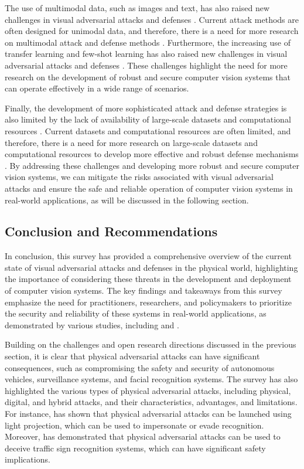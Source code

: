 \documentclass[11pt]{article}
\begin{document}
The use of multimodal data, such as images and text, has also raised new challenges in visual adversarial attacks and defenses \cite{ref229}. Current attack methods are often designed for unimodal data, and therefore, there is a need for more research on multimodal attack and defense methods \cite{ref230}. Furthermore, the increasing use of transfer learning and few-shot learning has also raised new challenges in visual adversarial attacks and defenses \cite{ref231}. These challenges highlight the need for more research on the development of robust and secure computer vision systems that can operate effectively in a wide range of scenarios.

Finally, the development of more sophisticated attack and defense strategies is also limited by the lack of availability of large-scale datasets and computational resources \cite{ref232}. Current datasets and computational resources are often limited, and therefore, there is a need for more research on large-scale datasets and computational resources to develop more effective and robust defense mechanisms \cite{ref233}. By addressing these challenges and developing more robust and secure computer vision systems, we can mitigate the risks associated with visual adversarial attacks and ensure the safe and reliable operation of computer vision systems in real-world applications, as will be discussed in the following section.

\subsection{Conclusion and Recommendations}

In conclusion, this survey has provided a comprehensive overview of the current state of visual adversarial attacks and defenses in the physical world, highlighting the importance of considering these threats in the development and deployment of computer vision systems. The key findings and takeaways from this survey emphasize the need for practitioners, researchers, and policymakers to prioritize the security and reliability of these systems in real-world applications, as demonstrated by various studies, including \cite{ref63} and \cite{ref99}.

Building on the challenges and open research directions discussed in the previous section, it is clear that physical adversarial attacks can have significant consequences, such as compromising the safety and security of autonomous vehicles, surveillance systems, and facial recognition systems. The survey has also highlighted the various types of physical adversarial attacks, including physical, digital, and hybrid attacks, and their characteristics, advantages, and limitations. For instance, \cite{ref32} has shown that physical adversarial attacks can be launched using light projection, which can be used to impersonate or evade recognition. Moreover, \cite{ref29} has demonstrated that physical adversarial attacks can be used to deceive traffic sign recognition systems, which can have significant safety implications.
\end{document}
